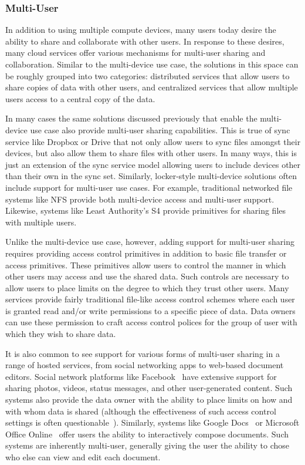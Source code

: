 \subsubsection{Multi-User}

In addition to using multiple compute devices, many users today desire
the ability to share and collaborate with other users. In response to
these desires, many cloud services offer various mechanisms for
multi-user sharing and collaboration. Similar to the multi-device use
case, the solutions in this space can be roughly grouped into two
categories: distributed services that allow users to share copies of
data with other users, and centralized services that allow multiple
users access to a central copy of the data.

In many cases the same solutions discussed previously that enable the
multi-device use case also provide multi-user sharing
capabilities. This is true of sync service like Dropbox or Drive that
not only allow users to sync files amongst their devices, but also
allow them to share files with other users. In many ways, this is just
an extension of the sync service model allowing users to include
devices other than their own in the sync set. Similarly, locker-style
multi-device solutions often include support for multi-user use
cases. For example, traditional networked file systems like NFS
provide both multi-device access and multi-user support. Likewise,
systems like Least Authority's S4 provide primitives for sharing files
with multiple users.

Unlike the multi-device use case, however, adding support for
multi-user sharing requires providing access control primitives in
addition to basic file transfer or access primitives. These primitives
allow users to control the manner in which other users may access and
use the shared data. Such controls are necessary to allow users to
place limits on the degree to which they trust other users. Many
services provide fairly traditional file-like access control schemes
where each user is granted read and/or write permissions to a specific
piece of data. Data owners can use these permission to craft access
control polices for the group of user with which they wish to share
data.

It is also common to see support for various forms of multi-user
sharing in a range of hosted services, from social networking apps to
web-based document editors. Social network platforms like
Facebook~\cite{facebook} have extensive support for sharing photos,
videos, status messages, and other user-generated content. Such
systems also provide the data owner with the ability to place limits
on how and with whom data is shared (although the effectiveness of
such access control settings is often
questionable~\cite{johnson2012}). Similarly, systems like Google
Docs~\cite{google-docs} or Microsoft Office
Online~\cite{microsoft-officeonline} offer users the ability to
interactively compose documents. Such systems are inherently
multi-user, generally giving the user the ability to chose who else
can view and edit each document.

